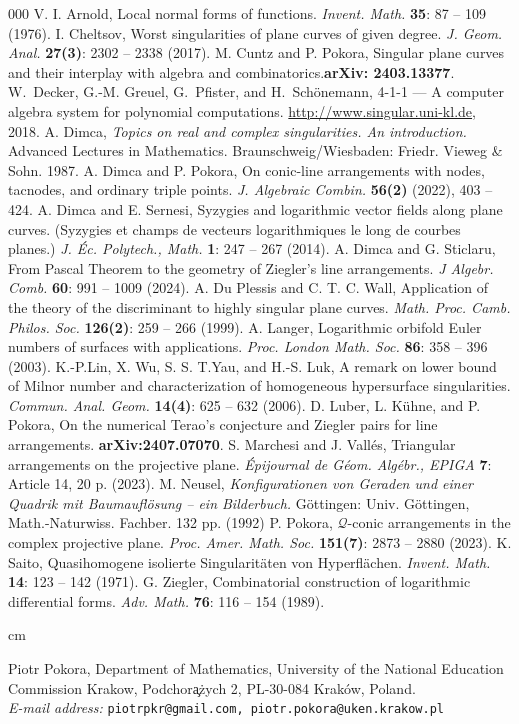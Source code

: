 \documentclass[12pt]{article}
\theoremstyle{plain}
\theoremstyle{definition}
\begin{document}
\begin{thebibliography}{000}
V. I. Arnold, Local normal forms of functions. \textit{Invent. Math.} \textbf{35}: 87 -- 109 (1976).
I. Cheltsov, Worst singularities of plane curves of given degree. 
\textit{J. Geom. Anal.} \textbf{27(3)}: 2302 -- 2338 (2017).
M. Cuntz and P. Pokora, Singular plane curves and their interplay with algebra and combinatorics.\textbf{arXiv: 2403.13377}. 
W.~Decker, G.-M. Greuel, G.~Pfister, and H.~Sch\"onemann,
 {4-1-1} --- {A} computer algebra system for polynomial computations. \newblock \url{http://www.singular.uni-kl.de}, 2018.
A. Dimca,  \textit{Topics on real and complex singularities. An introduction.} Advanced Lectures in Mathematics. Braunschweig/Wiesbaden: Friedr. Vieweg \& Sohn. 1987.
A. Dimca and P. Pokora, On conic-line arrangements with nodes, tacnodes, and ordinary triple points. \textit{J. Algebraic Combin.} \textbf{56(2)} (2022), 403 -- 424.
A. Dimca and E. Sernesi, Syzygies and logarithmic vector fields along plane curves. (Syzygies et champs de vecteurs logarithmiques le long de courbes planes.) \textit{J. Éc. Polytech., Math.} \textbf{1}: 247 -- 267 (2014).
A. Dimca and G. Sticlaru, From Pascal Theorem to the geometry of Ziegler's line arrangements. \textit{J Algebr. Comb.} \textbf{60}: 991 -- 1009 (2024).
A. Du Plessis and C. T. C. Wall, Application of the theory of the discriminant to highly singular plane curves. \textit{Math. Proc. Camb. Philos. Soc.} \textbf{126(2)}: 259 -- 266 (1999).
A. Langer, Logarithmic orbifold Euler numbers of surfaces with applications. \textit{Proc. London Math. Soc.} \textbf{86}: 358 -- 396 (2003).
K.-P.Lin, X. Wu, S. S. T.Yau, and H.-S. Luk, 
A remark on lower bound of Milnor number and characterization of homogeneous hypersurface singularities. \textit{Commun. Anal. Geom.} \textbf{14(4)}: 625 -- 632 (2006).
D. Luber, L. K\"uhne, and P. Pokora, On the numerical Terao's conjecture and Ziegler pairs for line arrangements. \textbf{arXiv:2407.07070}.
S. Marchesi and J. Vall\'es, Triangular arrangements on the projective plane. \textit{\'Epijournal de G\'eom. Alg\'ebr., EPIGA} \textbf{7}: Article 14, 20 p. (2023).
M. Neusel, \textit{Konfigurationen von Geraden und einer Quadrik mit Baumaufl\"osung – ein Bilderbuch.} G\"ottingen: Univ. G\"ottingen, Math.-Naturwiss. Fachber. 132 pp. (1992)
P. Pokora, $\mathcal{Q}$-conic arrangements in the complex projective plane. \textit{Proc. Amer. Math. Soc.} \textbf{151(7)}: 2873 -- 2880 (2023).
 K. Saito, Quasihomogene isolierte Singularit\"aten von Hyperfl\"achen. \textit{Invent. Math.} \textbf{14}: 123 -- 142 (1971).
G. Ziegler, Combinatorial construction of logarithmic differential forms. \textit{Adv. Math.} \textbf{76}: 116 -- 154 (1989).


\end{thebibliography}

 cm

\bigskip
Piotr Pokora,
Department of Mathematics,
University of the National Education Commission Krakow,
Podchor\c a\.zych 2,
PL-30-084 Krak\'ow, Poland. \\
\nopagebreak
\textit{E-mail address:} \texttt{piotrpkr@gmail.com, piotr.pokora@uken.krakow.pl}
\bigskip
\end{document}
